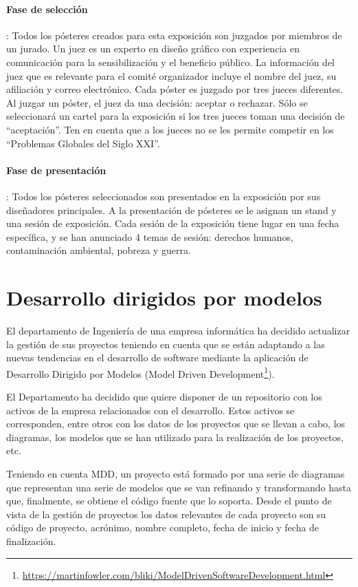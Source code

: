 \documentclass{db-practice}
\begin{document}
\paragraph{Fase de selección}: Todos los pósteres creados para esta exposición son juzgados por miembros de un jurado.  Un juez es un experto en diseño gráfico con experiencia en comunicación para la sensibilización y el beneficio público.  La información del juez que es relevante para el comité organizador incluye el nombre del juez, su afiliación y correo electrónico.  Cada póster es juzgado por tres jueces diferentes.  Al juzgar un póster, el juez da una decisión: aceptar o rechazar.  Sólo se seleccionará un cartel para la exposición si los tres jueces toman una decisión de ``aceptación''.  Ten en cuenta que a los jueces no se les permite competir en los ``Problemas Globales del Siglo XXI''.
\paragraph{Fase de presentación}: Todos los pósteres seleccionados son presentados en la exposición por sus diseñadores principales.  A la presentación de pósteres se le asignan un stand y una sesión de exposición.  Cada sesión de la exposición tiene lugar en una fecha específica, y se han anunciado 4 temas de sesión: derechos humanos, contaminación ambiental, pobreza y guerra.

\section{Desarrollo dirigidos por modelos}
El departamento de Ingeniería de una empresa informática ha decidido actualizar la gestión de sus proyectos teniendo en cuenta que se están adaptando a las nuevas tendencias en el desarrollo de software mediante la aplicación de Desarrollo Dirigido por Modelos (Model Driven Development\footnote{\url{https://martinfowler.com/bliki/ModelDrivenSoftwareDevelopment.html}}).

El Departamento ha decidido que quiere disponer de un repositorio con los activos de la empresa relacionados con el desarrollo. Estos activos se corresponden, entre otros con los datos de los proyectos que se llevan a cabo, los diagramas, los modelos que se han utilizado para la realización de los proyectos, etc.

Teniendo en cuenta MDD, un proyecto está formado por una serie de diagramas que representan una serie de modelos que se van refinando y transformando hasta que, finalmente, se obtiene el código fuente que lo soporta. Desde el punto de vista de la gestión de proyectos los datos relevantes de cada proyecto son su código de proyecto, acrónimo, nombre completo, fecha de inicio y fecha de finalización.
\end{document}
